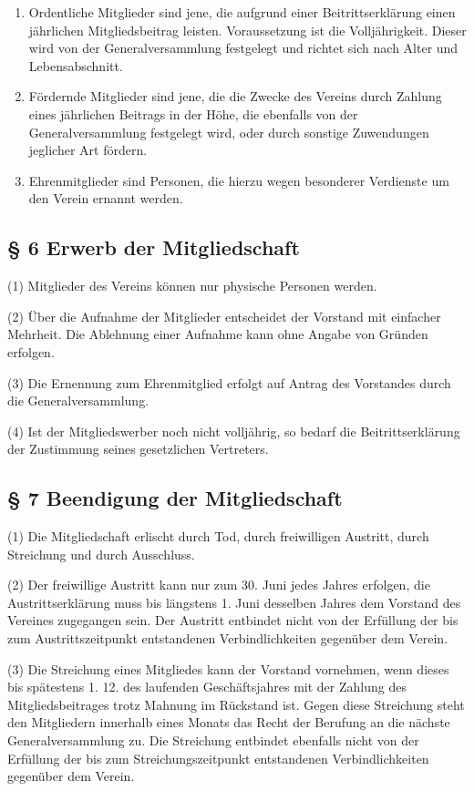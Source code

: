 \documentclass[10pt,a4paper]{article}
\begin{document}
\begin{enumerate}[label=\alph*)]
\item
Ordentliche Mitglieder sind jene, die aufgrund einer Beitrittserklärung einen jährlichen Mitgliedsbeitrag leisten.
Voraussetzung ist die Volljährigkeit.
Dieser wird von der Generalversammlung festgelegt und richtet sich nach Alter und Lebensabschnitt.
\item
Fördernde Mitglieder sind jene, die die Zwecke des Vereins durch Zahlung eines jährlichen Beitrags in der Höhe, die ebenfalls von der Generalversammlung festgelegt wird, oder durch sonstige Zuwendungen jeglicher Art fördern.
\item
Ehrenmitglieder sind Personen, die hierzu wegen besonderer Verdienste um den Verein ernannt werden.
\end{enumerate}

\subsection{§ 6
Erwerb der Mitgliedschaft}

(1)
Mitglieder des Vereins können nur physische Personen werden.

(2)
Über die Aufnahme der Mitglieder entscheidet der Vorstand mit einfacher Mehrheit.
Die Ablehnung einer Aufnahme kann ohne Angabe von Gründen erfolgen.

(3)
Die Ernennung zum Ehrenmitglied erfolgt auf Antrag des Vorstandes durch die Generalversammlung.

(4)
Ist der Mitgliedswerber noch nicht volljährig, so bedarf die Beitrittserklärung der Zustimmung seines gesetzlichen Vertreters.

\subsection{§ 7
Beendigung der Mitgliedschaft}

(1)
Die Mitgliedschaft erlischt durch Tod, durch freiwilligen Austritt, durch Streichung und durch Ausschluss.

(2)
Der freiwillige Austritt kann nur zum 30. Juni jedes Jahres erfolgen, die Austrittserklärung muss bis längstens 1. Juni desselben Jahres dem Vorstand des Vereines zugegangen sein.
Der Austritt entbindet nicht von der Erfüllung der bis zum Austrittszeitpunkt entstandenen Verbindlichkeiten gegenüber dem Verein.

(3)
Die Streichung eines Mitgliedes kann der Vorstand vornehmen, wenn dieses bis spätestens 1. 12. des laufenden Geschäftsjahres mit der Zahlung des Mitgliedsbeitrages trotz Mahnung im Rückstand ist.
Gegen diese Streichung steht den Mitgliedern innerhalb eines Monats das Recht der Berufung an die nächste Generalversammlung zu.
Die Streichung entbindet ebenfalls nicht von der Erfüllung der bis zum Streichungszeitpunkt entstandenen Verbindlichkeiten gegenüber dem Verein.
\end{document}
